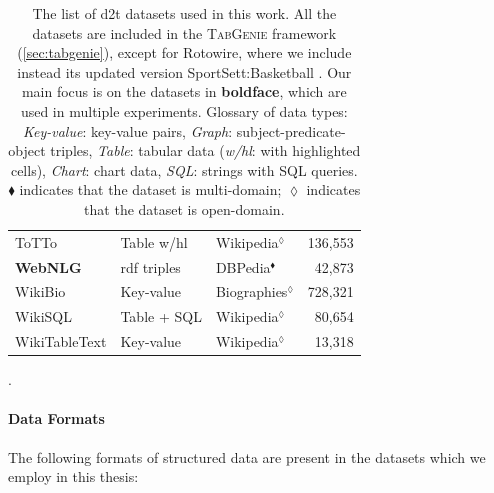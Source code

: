 {\begin{table}[t]
\begin{tabular}{@{}lllr@{}}
        ToTTo \cite{parikhToTToControlledTableToText2020}                                          & Table w/hl           & Wikipedia$^\lozenge$    & 136,553         \\
        \textbf{WebNLG} \cite{gardentWebNLGChallengeGenerating2017}                                & \acs{rdf} triples    & DBPedia$^\blacklozenge$ & 42,873          \\
        WikiBio \cite{lebretNeuralTextGeneration2016}                                              & Key-value            & Biographies$^\lozenge$  & 728,321         \\
        WikiSQL \cite{zhong2017seq2sql}                                                            & Table + SQL          & Wikipedia$^\lozenge$    & 80,654          \\
        WikiTableText \cite{bao2018table}                                                          & Key-value            & Wikipedia$^\lozenge$    & 13,318          \\
        \bottomrule
    \end{tabular}
    \caption{The list of \ac{d2t} datasets used in this work. All the datasets are included in the \textsc{TabGenie} framework (\autoref{sec:tabgenie}), except for Rotowire, where we include instead its updated version SportSett:Basketball \cite{thomson2020sportsett}. Our main focus is on the datasets in \textbf{boldface}, which are used in multiple experiments. Glossary of data types: \textit{Key-value}: key-value pairs, \textit{Graph}: subject-predicate-object triples, \textit{Table}: tabular data (\textit{w/hl}: with highlighted cells), \textit{Chart}: chart data, \textit{SQL}: strings with SQL queries. $\blacklozenge$ indicates that the dataset is multi-domain; $\lozenge$ indicates that the dataset is open-domain.}
    \label{tab:datasets}.
\end{table}

\paragraph{Data Formats} The following formats of structured data are present in the datasets which we employ in this thesis:

}
